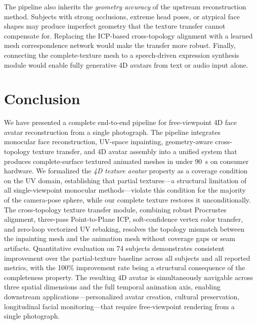 \documentclass[conference]{IEEEtran}
\begin{document}
The pipeline also inherits the \emph{geometry accuracy} of the upstream
reconstruction method. Subjects with strong occlusions, extreme head poses, or
atypical face shapes may produce imperfect geometry that the texture transfer
cannot compensate for. Replacing the ICP-based cross-topology alignment with a
learned mesh correspondence network would make the transfer more robust.
Finally, connecting the complete-texture mesh to a speech-driven expression
synthesis module would enable fully generative 4D avatars from text or audio
input alone.

\section{Conclusion}

We have presented a complete end-to-end pipeline for free-viewpoint 4D face
avatar reconstruction from a single photograph. The pipeline integrates
monocular face reconstruction, UV-space inpainting, geometry-aware
cross-topology texture transfer, and 4D avatar assembly into a unified system
that produces complete-surface textured animated meshes in under 90~s on
consumer hardware. We formalized the \emph{4D texture avatar} property as a
coverage condition on the UV domain, establishing that partial textures---a
structural limitation of all single-viewpoint monocular methods---violate this
condition for the majority of the camera-pose sphere, while our complete texture
restores it unconditionally. The cross-topology texture transfer module,
combining robust Procrustes alignment, three-pass Point-to-Plane ICP,
soft-confidence vertex color transfer, and zero-loop vectorized UV rebaking,
resolves the topology mismatch between the inpainting mesh and the animation
mesh without coverage gaps or seam artifacts. Quantitative evaluation on 74
subjects demonstrates consistent improvement over the partial-texture baseline
across all subjects and all reported metrics, with the 100\% improvement rate
being a structural consequence of the completeness property. The resulting 4D
avatar is simultaneously navigable across three spatial dimensions and the full
temporal animation axis, enabling downstream applications---personalized avatar
creation, cultural preservation, longitudinal facial monitoring---that require
free-viewpoint rendering from a single photograph.
\end{document}

